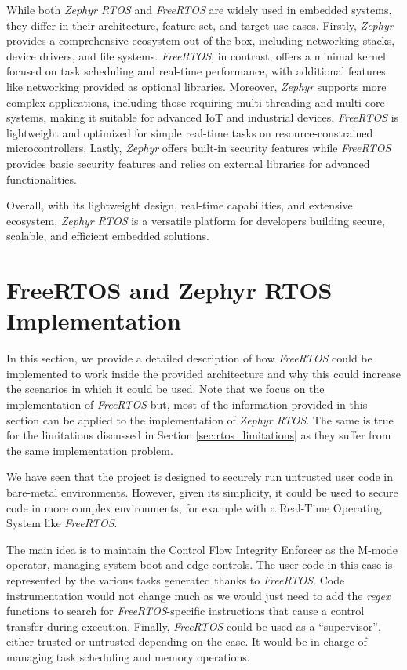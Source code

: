 While both \textit{Zephyr RTOS} and \textit{FreeRTOS} are widely used in embedded
systems, they differ in their architecture, feature set, and target use cases. Firstly,
\textit{Zephyr} provides a comprehensive ecosystem out of the box, including
networking stacks, device drivers, and file systems. \textit{FreeRTOS}, in contrast,
offers a minimal kernel focused on task scheduling and real-time performance, with
additional features like networking provided as optional libraries. Moreover, \textit{Zephyr}
supports more complex applications, including those requiring multi-threading and
multi-core systems, making it suitable for advanced IoT and industrial devices. \textit{FreeRTOS}
is lightweight and optimized for simple real-time tasks on resource-constrained
microcontrollers. Lastly, \textit{Zephyr} offers built-in security features while
\textit{FreeRTOS} provides basic security features and relies on external
libraries for advanced functionalities.

Overall, with its lightweight design, real-time capabilities, and extensive ecosystem,
\textit{Zephyr RTOS} is a versatile platform for developers building secure,
scalable, and efficient embedded solutions.

\section{FreeRTOS and Zephyr RTOS Implementation}
\label{sec:rtos_porting}

In this section, we provide a detailed description of how \textit{FreeRTOS}
could be implemented to work inside the provided architecture and why this could
increase the scenarios in which it could be used. Note that we focus on the implementation
of \textit{FreeRTOS} but, most of the information provided in this section can be
applied to the implementation of \textit{Zephyr RTOS}. The same is true for the limitations
discussed in Section \ref{sec:rtos_limitations} as they suffer from the same implementation
problem.

We have seen that the project is designed to securely run untrusted user code in
bare-metal environments. However, given its simplicity, it could be used to
secure code in more complex environments, for example with a Real-Time Operating
System like \textit{FreeRTOS}.

The main idea is to maintain the Control Flow Integrity Enforcer as the M-mode
operator, managing system boot and edge controls. The user code in this case is
represented by the various tasks generated thanks to \textit{FreeRTOS}. Code
instrumentation would not change much as we would just need to add the \textit{regex}
functions to search for \textit{FreeRTOS}-specific instructions that cause a
control transfer during execution. Finally, \textit{FreeRTOS} could be used as a
``supervisor'', either trusted or untrusted depending on the case. It would be in
charge of managing task scheduling and memory operations.

